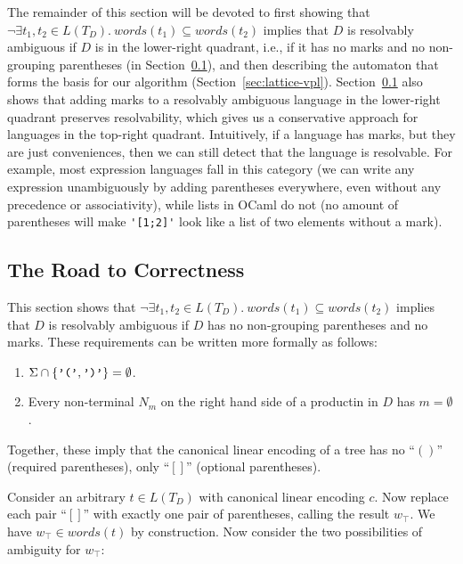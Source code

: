 \documentclass[runningheads]{llncs}
\newcommand{\T}{\Sigma} %
\newcommand{\words}{\mathit{words}} %
\newcommand{\reqpl}{(}
\newcommand{\reqpr}{)}
\newcommand{\reqp}[1]{\reqpl#1\reqpr}
\newcommand{\pospl}{[}
\newcommand{\pospr}{]}
\newcommand{\posp}[1]{\pospl#1\pospr}
\begin{document}
The remainder of this section will be devoted to first showing that $\neg \exists t_1, t_2 \in L(T_D).\ \words(t_1) \subseteq \words(t_2)$ implies that $D$ is resolvably ambiguous if $D$ is in the lower-right quadrant, i.e., if it has no marks and no non-grouping parentheses (in Section~\ref{sec:static-proofs}), and then describing the automaton that forms the basis for our algorithm (Section~\ref{sec:lattice-vpl}). Section~\ref{sec:static-proofs} also shows that adding marks to a resolvably ambiguous language in the lower-right quadrant preserves resolvability, which gives us a conservative approach for languages in the top-right quadrant. Intuitively, if a language has marks, but they are just conveniences, then we can still detect that the language is resolvable. For example, most expression languages fall in this category (we can write any expression unambiguously by adding parentheses everywhere, even without any precedence or associativity), while lists in OCaml do not (no amount of parentheses will make \verb|'[1;2]'| look like a list of two elements without a mark).

\subsection{The Road to Correctness} \label{sec:static-proofs} %

This section shows that $\neg \exists t_1, t_2 \in L(T_D).\ \words(t_1) \subseteq \words(t_2)$ implies that $D$ is resolvably ambiguous if $D$ has no non-grouping parentheses and no marks. These requirements can be written more formally as follows:

\begin{enumerate}
  \item $\T \cap \{\verb|'('|, \verb|')'|\} = \emptyset$.
  \item Every non-terminal $N_m$ on the right hand side of a productin in $D$ has $m = \emptyset$.
\end{enumerate}

\noindent Together, these imply that the canonical linear encoding of a tree has no ``$\reqp{}$'' (required parentheses), only ``$\posp{}$'' (optional parentheses).

Consider an arbitrary $t \in L(T_D)$ with canonical linear encoding $c$. Now replace each pair ``$\posp{}$'' with exactly one pair of parentheses, calling the result $w_\top$. We have $w_\top \in \words(t)$ by construction. Now consider the two possibilities of ambiguity for $w_\top$:
\end{document}
